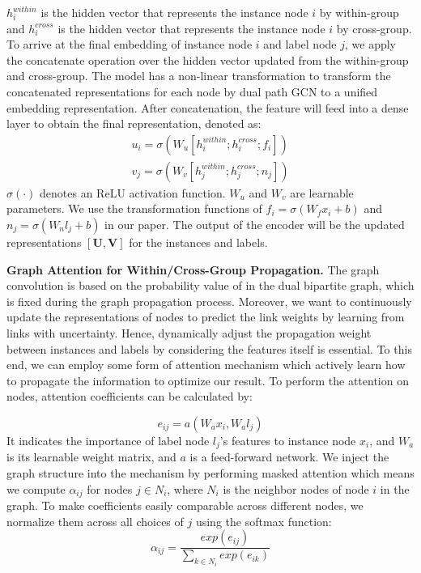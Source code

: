 \documentclass[letterpaper]{article} \usepackage{aaai20}  \usepackage{times}  \usepackage{helvet} \usepackage{courier}  \usepackage[hyphens]{url}  \usepackage{graphicx} \urlstyle{rm} \def\UrlFont{\rm}  \frenchspacing  \setlength{\pdfpagewidth}{8.5in}  \setlength{\pdfpageheight}{11in}  \frenchspacing
\begin{document}
$h_i^{within}$ is the hidden vector that represents the instance node $i$ by within-group and $h_i^{cross}$ is the hidden vector that represents the instance node $i$ by cross-group. 
To arrive at the final embedding of instance node $i$ and label node $j$, we apply the concatenate operation over the hidden vector updated from the within-group and cross-group.
The model has a non-linear transformation to transform the concatenated representations for each node by dual path GCN to a unified embedding representation. After concatenation, the feature will feed into a dense layer to obtain the final representation, denoted as:
\begin{align}
    u_i =  \sigma (W_u[h_i^{within};h_i^{cross};f_i])  \\
   v_j = \sigma (W_v[h_j^{within};h_j^{cross};n_j])
\end{align}
$\sigma (\cdot)$ denotes an ReLU activation function. $W_u$ and $W_v$ are learnable parameters.
We use the transformation functions of $f_i = \sigma(W_f x_i+b)$ and $n_j = \sigma(W_nl_j+b)$ in our paper. The output of the encoder will be the updated representations $[\boldsymbol{U,V}]$ for the instances and labels. 



\noindent\textbf{Graph Attention for Within/Cross-Group Propagation.}
The graph convolution is based on the probability value of in the dual bipartite graph, which is fixed during the graph propagation process. Moreover, we want to continuously update the representations of nodes to predict the link weights by learning from links with uncertainty. Hence, dynamically adjust the propagation weight between instances and labels by considering the features itself is essential. 
To this end, we can 
employ some form of attention mechanism \cite{velivckovic2017graph} which actively learn how to propagate the information to optimize our result. To perform the attention on nodes, attention coefficients can be calculated by: 

\begin{equation}
e_{ij} = a(W_{a}x_i,W_{a}l_j)  
\end{equation}
It indicates the importance of label node $l_j$'s features to instance node $x_i$, and $W_a$ is its learnable weight matrix, and $a$ is a feed-forward network. We inject the graph structure into the mechanism by performing masked attention which means we compute $\alpha_{ij}$ for nodes $j \in  N_i$, where $N_i$ is the neighbor nodes of node $i$ in the graph.
To make coefficients easily comparable across different nodes, we normalize them across all choices of $j$ using the softmax function:
\begin{equation}
\alpha_{ij} = \frac{exp(e_{ij})}{\sum_{k \in N_i} exp(e_{ik})}  
\end{equation}
\end{document}
